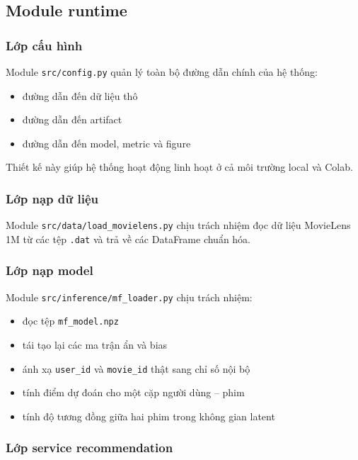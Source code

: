 \documentclass[12pt,a4paper]{article}
\begin{document}
\subsection{Module runtime}

\subsubsection{Lớp cấu hình}

Module \texttt{src/config.py} quản lý toàn bộ đường dẫn chính của hệ thống:

\begin{itemize}[leftmargin=1.5cm]
    \item đường dẫn đến dữ liệu thô
    \item đường dẫn đến artifact
    \item đường dẫn đến model, metric và figure
\end{itemize}

Thiết kế này giúp hệ thống hoạt động linh hoạt ở cả môi trường local và Colab.

\subsubsection{Lớp nạp dữ liệu}

Module \texttt{src/data/load\_movielens.py} chịu trách nhiệm đọc dữ liệu MovieLens 1M từ các tệp \texttt{.dat} và trả về các DataFrame chuẩn hóa.

\subsubsection{Lớp nạp model}

Module \texttt{src/inference/mf\_loader.py} chịu trách nhiệm:

\begin{itemize}[leftmargin=1.5cm]
    \item đọc tệp \texttt{mf\_model.npz}
    \item tái tạo lại các ma trận ẩn và bias
    \item ánh xạ \texttt{user\_id} và \texttt{movie\_id} thật sang chỉ số nội bộ
    \item tính điểm dự đoán cho một cặp người dùng -- phim
    \item tính độ tương đồng giữa hai phim trong không gian latent
\end{itemize}

\subsubsection{Lớp service recommendation}
\end{document}
